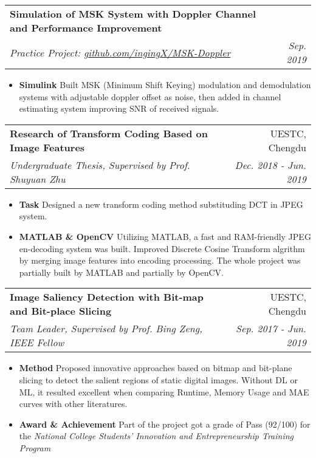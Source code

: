 \documentclass[9pt, a4paper]{article}
\makeatletter
\newcommand{\resumeItem}[2]{
  \item\small{
    \textbf{#1}{ #2 \vspace{-2pt}}
  }
}
\newcommand{\resumeSubheading}[4]{
  \vspace{-1pt}\item
    \begin{tabular*}{0.97\textwidth}{l@{\extracolsep{\fill}}r}
      \textbf{#1} & #2 \\
      \textit{\small#3} & \textit{\small #4} \\
    \end{tabular*}\vspace{-5pt}
}
\newcommand{\resumeItemListStart}{\begin{itemize}}
\newcommand{\resumeItemListEnd}{\end{itemize}\vspace{-5pt}}
\makeatother
\begin{document}
    \resumeSubheading
      {Simulation of MSK System with Doppler Channel and Performance Improvement}{}
      {Practice Project: \href{https://github.com/ingingX/MSK-Doppler}{github.com/ingingX/MSK-Doppler}}{Sep. 2019}
      \resumeItemListStart
        \resumeItem{Simulink}
          {Built MSK (Minimum Shift Keying) modulation and demodulation systems with adjustable doppler offset as noise, then added in channel estimating system improving SNR of received signals. }
      \resumeItemListEnd


    \resumeSubheading
      {Research of Transform Coding Based on Image Features}{UESTC, Chengdu}
      {Undergraduate Thesis, Supervised by Prof. Shuyuan Zhu}{Dec. 2018 - Jun. 2019}
      \resumeItemListStart
        \resumeItem{Task}
          {Designed a new transform coding method substituding DCT in JPEG system.}
        \resumeItem{MATLAB \& OpenCV}
          {Utilizing MATLAB, a fast and RAM-friendly JPEG en-decoding system was built. Improved Discrete Cosine Transform algrithm by merging image features into encoding processing. The whole project was partially built by MATLAB and partially by OpenCV.}
      \resumeItemListEnd

    \resumeSubheading
    {Image Saliency Detection with Bit-map and Bit-place Slicing}{UESTC, Chengdu}
    {Team Leader, Supervised by Prof. Bing Zeng, IEEE Fellow}{Sep. 2017 - Jun. 2019}
    \resumeItemListStart
      \resumeItem{Method}
        {Proposed innovative approaches based on bitmap and bit-plane slicing to detect the salient regions of static digital images. Without DL or ML, it resulted excellent when comparing Runtime, Memory Usage and MAE curves with other literatures.}
        \resumeItem{Award \& Achievement}
        {Part of the project got a grade of Pass (92/100) for the \textsl{National College Students' Innovation and Entrepreneurship Training Program}}
    \resumeItemListEnd
\end{document}

